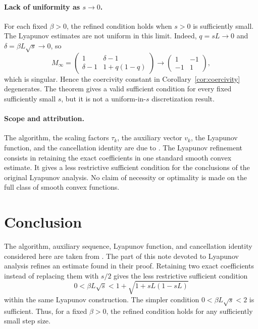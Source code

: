 \documentclass[11pt]{article}
\theoremstyle{plain}
\theoremstyle{definition}
\begin{document}
{
\paragraph{Lack of uniformity as $s\to0$.}
For each fixed $\beta>0$, the refined condition holds when $s>0$ is
sufficiently small. The Lyapunov estimates are not uniform in this limit.
Indeed, $q=sL\to0$ and $\delta=\beta L\sqrt{s}\to0$, so
$$
M_\infty
=\begin{pmatrix}1&\delta-1\\ \delta-1&1+q(1-q)\end{pmatrix}
\longrightarrow
\begin{pmatrix}1&-1\\ -1&1\end{pmatrix},
$$
which is singular. Hence the coercivity constant in
Corollary~\ref{cor:coercivity} degenerates. The theorem gives a valid sufficient condition for every fixed sufficiently small $s$, but it is not a
uniform-in-$s$ discretization result.
}

{
\paragraph{Scope and attribution.}
The algorithm, the scaling factors $\tau_k$, the auxiliary vector $v_k$, the
Lyapunov function, and the cancellation identity are due to
\cite{AFCR2022}. The Lyapunov refinement consists in retaining the exact
coefficients in one standard smooth convex estimate. It gives a less
restrictive sufficient condition for the conclusions of the original
Lyapunov analysis. No claim of necessity or optimality is made on the full
class of smooth convex functions.

}
\section{Conclusion}\label{sec:conclusion}
The algorithm, auxiliary sequence, Lyapunov function, and cancellation identity considered here are taken from \cite{AFCR2022}. The part of this note devoted to Lyapunov analysis refines an estimate found in their proof. Retaining two exact coefficients instead of replacing them with $s/2$ gives the less restrictive sufficient condition
$$
0<\beta L\sqrt{s}<1+\sqrt{1+sL(1-sL)}
$$
within the same Lyapunov construction. The simpler condition $0<\beta L\sqrt{s}<2$ is sufficient. Thus, for a fixed $\beta>0$, the refined condition holds for any sufficiently small step size. 
\end{document}
